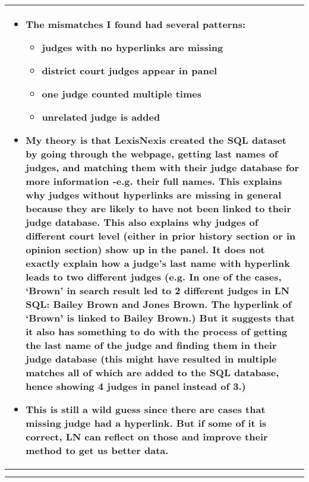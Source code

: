 \documentclass[10pt, letterpaper]{article}
\begin{document}
\begin{spacing}{1.0}
\begin{longtable}{p{6.5in}}
\begin{itemize}
\begin{itemize}
            \item The mismatches I found had several patterns:
            \begin{itemize}
                \item judges with no hyperlinks are missing
                \item district court judges appear in panel
                \item one judge counted multiple times
                \item unrelated judge is added
            \end{itemize}
        
            \item My theory is that LexisNexis created the SQL dataset by going through the webpage, getting last names of judges, and matching them with their judge database for more information  -e.g. their full names. This explains why judges without hyperlinks are missing in general because they are likely to have not been linked to their judge database. This also explains why judges of different court level (either in prior history section or in opinion section) show up in the panel. It does not exactly explain how a judge’s last name with hyperlink leads to two different judges (e.g. In one of the cases, ‘Brown' in search result led to 2 different judges in LN SQL: Bailey Brown and Jones Brown. The hyperlink of ‘Brown’  is linked to Bailey Brown.) But it suggests that it also has something to do with the process of getting the last name of the judge and finding them in their judge database (this might have resulted in multiple matches all of which are added to the SQL database, hence showing 4 judges in panel instead of 3.)
            
            \item This is still a wild guess since there are cases that missing judge had a hyperlink. But if some of it is correct, LN can reflect on those and improve their method to get us better data.
        
      \end{itemize}

    \end{itemize}\\

    \hline\\[-6pt]
  \label{tb:BKPanelSize01}
\end{longtable}

\clearpage

\small


\end{spacing}
\end{document}
